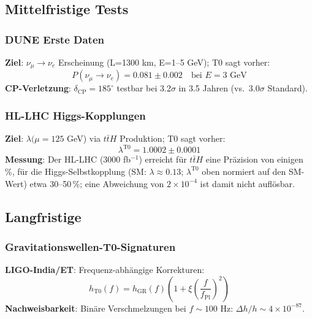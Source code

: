 	\subsection{Mittelfristige Tests}
	
	\subsubsection{DUNE Erste Daten}
	
	\textbf{Ziel}: $\nu_\mu \to \nu_e$ Erscheinung (L=1300 km, E=1--5 GeV); T0 sagt vorher:
	\begin{equation}
		P(\nu_\mu \to \nu_e) = 0.081 \pm 0.002 \quad \text{bei } E=3 \text{ GeV} \tag{ML-Gl.~6.2}
	\end{equation}
	\textbf{CP-Verletzung}: $\delta_{\text{CP}} = 185^\circ$ testbar bei 3.2$\sigma$ in 3.5 Jahren (vs.~3.0$\sigma$ Standard).
	
	\subsubsection{HL-LHC Higgs-Kopplungen}
	
	\textbf{Ziel}: $\lambda(\mu=125$ GeV) via $t\bar{t}H$ Produktion; T0 sagt vorher:
	\begin{equation}
		\lambda^{\text{T0}} = 1.0002 \pm 0.0001 \tag{ML-Gl.~6.3}
	\end{equation}
	\textbf{Messung}: Der HL-LHC (3000 fb$^{-1}$) erreicht für $t\bar{t}H$ eine Präzision von einigen \%, für die Higgs-Selbstkopplung (SM: $\lambda \approx 0.13$; $\lambda^{\text{T0}}$ oben normiert auf den SM-Wert) etwa 30--50\,\%; eine Abweichung von $2\times10^{-4}$ ist damit nicht auflösbar.
	
	\subsection{Langfristige}
	
	\subsubsection{Gravitationswellen-T0-Signaturen}
	
	\textbf{LIGO-India/ET}: Frequenz-abhängige Korrekturen:
	\begin{equation}
		h_{\text{T0}}(f) = h_{\text{GR}}(f) \left(1 + \xi \left(\frac{f}{f_{\text{Pl}}}\right)^2\right) \tag{T0-Orig Gl.~8.1.2}
	\end{equation}
	\textbf{Nachweisbarkeit}: Binäre Verschmelzungen bei $f\sim100$ Hz: $\Delta h/h \sim 4\times10^{-87}$.
	
